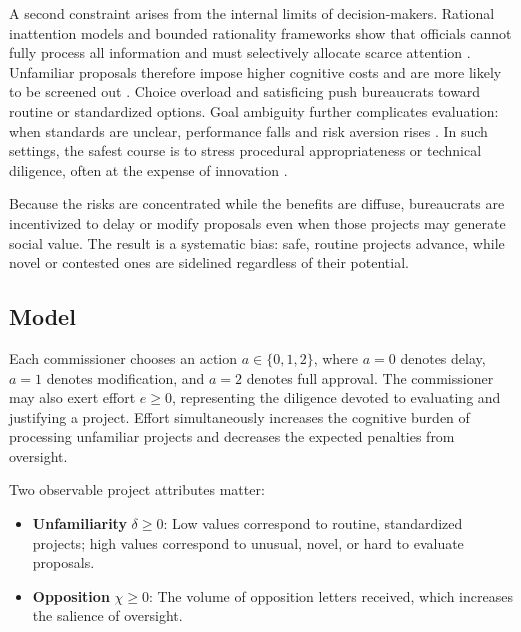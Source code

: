 A second constraint arises from the internal limits of decision-makers. Rational inattention models \citep{HebertWoodford2023} and bounded rationality frameworks \citep{deClippelRozen2021} show that officials cannot fully process all information and must selectively allocate scarce attention \citep{BesleyGhatak2003}. Unfamiliar proposals therefore impose higher cognitive costs and are more likely to be screened out \citep{DeFrancescoRadaelliTroeger2012}. Choice overload and satisficing push bureaucrats toward routine or standardized options. Goal ambiguity further complicates evaluation: when standards are unclear, performance falls and risk aversion rises \citep{AndersonStritch2016}. In such settings, the safest course is to stress procedural appropriateness or technical diligence, often at the expense of innovation \citep{Gilad2015,Duvanova2012}.

Because the risks are concentrated while the benefits are diffuse, bureaucrats are incentivized to delay or modify proposals even when those projects may generate social value. The result is a systematic bias: safe, routine projects advance, while novel or contested ones are sidelined regardless of their potential.


\subsection{Model}

Each commissioner chooses an action $a \in \{0,1,2\}$, where $a=0$ denotes delay, $a=1$ denotes modification, and $a=2$ denotes full approval. The commissioner may 
also exert effort $e \geq 0$, representing the diligence devoted to evaluating and justifying a project. Effort simultaneously increases the cognitive burden of processing unfamiliar projects and decreases the expected penalties from oversight.

Two observable project attributes matter:

\begin{itemize}
    \item \textbf{Unfamiliarity} $\delta \geq 0$: Low values correspond to routine, standardized projects; high values correspond to unusual, novel, or hard to evaluate proposals.
    \item \textbf{Opposition} $\chi \geq 0$: The volume of opposition letters received, which increases the salience of oversight.
\end{itemize}

